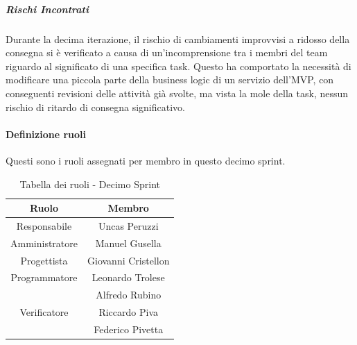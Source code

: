 \documentclass[10pt]{article}
\begin{document}
{{{{{{{{{{{            \subparagraph*{Rischi Incontrati}\mbox{}
            Durante la decima iterazione, il rischio di cambiamenti improvvisi a ridosso della consegna si è verificato a causa di un'incomprensione tra i membri del team riguardo al significato di una specifica task. Questo ha comportato la necessità di modificare una piccola parte della business logic di un servizio dell'MVP, con conseguenti revisioni delle attività già svolte, ma vista la mole della task, nessun rischio di ritardo di consegna significativo.
            
            
            \paragraph{Definizione ruoli}\mbox{}\vspace{0.4em}
            
            Questi sono i ruoli assegnati per membro in questo decimo sprint.\\
            \begin{table}[H]
                \centering
                \begin{tabular}{|c|c|}
                \hline
                \rowcolor{gray!25}
                \textbf{Ruolo} & \textbf{Membro}\\
                \hline
                Responsabile & Uncas Peruzzi \\
                \hline
                Amministratore & Manuel Gusella \\
                \hline
                Progettista & Giovanni Cristellon \\
                \hline
                Programmatore & Leonardo Trolese \\ & Alfredo Rubino \\
                \hline
                Verificatore & Riccardo Piva\\ & Federico Pivetta \\
                \hline
                \end{tabular}
                \caption{Tabella dei ruoli - Decimo Sprint}
            \end{table}
    
}}}}}}}}}}}
\end{document}
